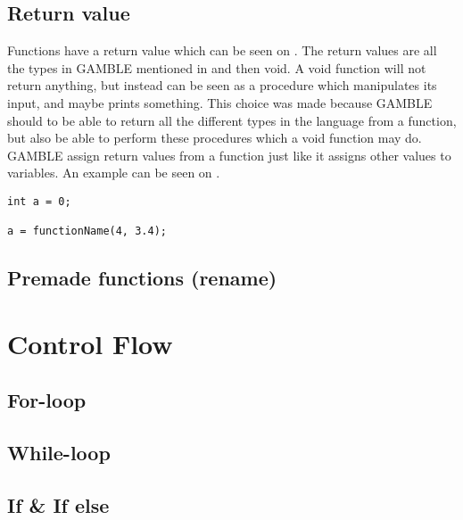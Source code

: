 \subsection{Return value}
Functions have a return value which can be seen on .
The return values are all the types in GAMBLE mentioned in  and then void. 
A void function will not return anything, but instead can be seen as a procedure which manipulates its input, and maybe prints something.
This choice was made because GAMBLE should to be able to return all the different types in the language from a function, but also be able to perform these procedures which a void function may do.
GAMBLE assign return values from a function just like it assigns other values to variables.
An example can be seen on .

\begin{lstlisting}[label=returnFunction]
int a = 0;

a = functionName(4, 3.4);
\end{lstlisting}

\subsection{Premade functions (rename)}


\section{Control Flow}
\subsection{For-loop}

\subsection{While-loop}

\subsection{If \& If else}

